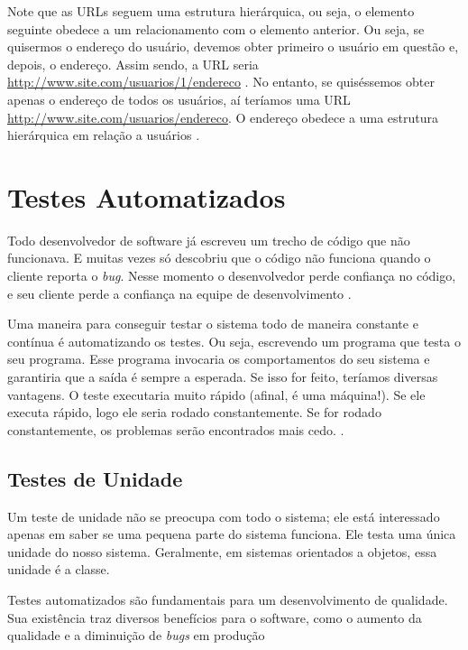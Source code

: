 Note que as URLs seguem uma estrutura hierárquica, ou seja, o elemento seguinte obedece a um relacionamento com o elemento anterior. Ou seja, se quisermos o endereço do usuário, devemos obter primeiro o usuário em questão e, depois, o endereço. Assim sendo, a URL seria \url{http://www.site.com/usuarios/1/endereco} . No entanto, se quiséssemos obter apenas o endereço de todos os usuários, aí teríamos uma URL \url{http://www.site.com/usuarios/endereco}. O endereço obedece a uma estrutura hierárquica em relação a usuários \cite{Saudate:2012}.


\section{Testes Automatizados} \label{sec:TestesAutomatizados}

Todo desenvolvedor de software já escreveu um trecho de código que não funcionava. E muitas vezes só descobriu que o código não funciona quando o cliente reporta o \textit{bug}. Nesse momento o desenvolvedor perde confiança no código, e seu cliente perde a confiança na equipe de desenvolvimento \cite{Aniche:2015}.

Uma maneira para conseguir testar o sistema todo de maneira constante e contínua é automatizando os testes. Ou seja, escrevendo um programa que testa o seu programa. Esse programa invocaria os comportamentos do seu sistema e garantiria que a saída é sempre a esperada. Se isso for feito, teríamos diversas vantagens. O teste executaria muito rápido (afinal, é uma máquina!). Se ele executa rápido, logo ele seria rodado constantemente. Se for rodado constantemente, os problemas serão encontrados mais cedo. \cite{Aniche:2012}.

\subsection{Testes de Unidade}\label{Testes Automatizados}

Um teste de unidade não se preocupa com todo o sistema; ele está interessado apenas em saber se uma pequena parte do sistema funciona. Ele testa uma única unidade do nosso sistema. Geralmente, em sistemas orientados a objetos, essa unidade é a classe.

Testes automatizados são fundamentais para um desenvolvimento de qualidade. Sua existência traz diversos benefícios para o software, como o aumento da qualidade e a diminuição de \textit{bugs} em produção \cite{Aniche:2012}


